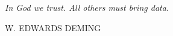 \documentclass[14pt, svgnames, openany]{memoir}
\begin{document}

\clearpage
\thispagestyle{empty}
\null\vfill

\begin{center}
\parbox{\dimexpr\linewidth-2cm}{%
  \raggedright{\LARGE \itshape%
   In God we trust. All others must bring data.\par\bigskip
  }  
\raggedleft\Large\MakeUppercase{W. Edwards Deming}\par%
}
\end{center}


\vfill\vfill

\clearpage


\tableofcontents



\end{document}
